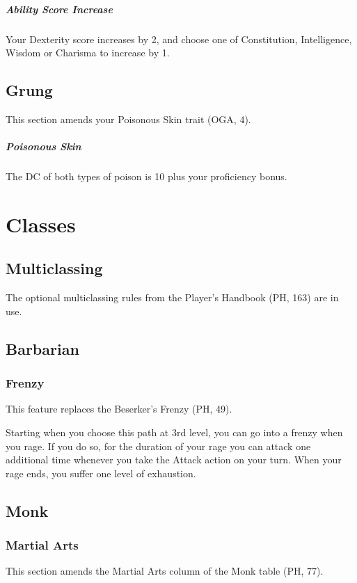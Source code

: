\documentclass[letterpaper,twocolumn,openany,nodeprecatedcode]{dndbook}
\begin{document}
\subparagraph{Ability Score Increase} Your Dexterity score increases by 2, and choose one of Constitution, Intelligence, Wisdom or Charisma to increase by 1.

\subsection{Grung}
This section amends your Poisonous Skin trait (OGA, 4).

\subparagraph{Poisonous Skin} The DC of both types of poison is 10 plus your proficiency bonus.




\section{Classes}

\subsection{Multiclassing}
The optional multiclassing rules from the Player's Handbook (PH, 163) are in use.

\subsection{Barbarian}

\subsubsection{Frenzy}
This feature replaces the Beserker's Frenzy (PH, 49).

Starting when you choose this path at 3rd level, you can go into a frenzy when you rage. If you do so, for the duration of your rage you can attack one additional time whenever you take the Attack action on your turn. When your rage ends, you suffer one level of exhaustion.

\subsection{Monk}

\subsubsection{Martial Arts}
This section amends the Martial Arts column of the Monk table (PH, 77).
\end{document}
